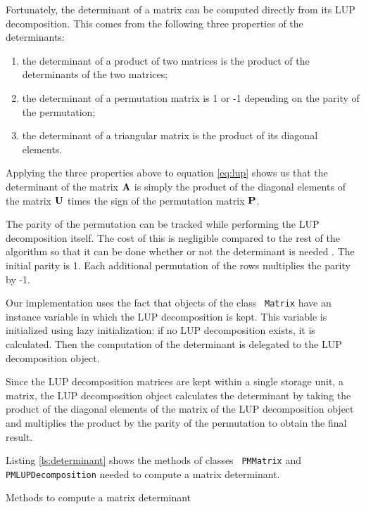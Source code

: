 \documentclass[twoside]{book}
\begin{document}
Fortunately, the determinant of a matrix can be computed directly
from its LUP decomposition. This comes from the following three
properties of the determinants:
\begin{enumerate}
  \item the determinant of a product of two matrices is the product of the determinants of the two
  matrices;
  \item the determinant of a permutation matrix is 1 or -1 depending on the parity of the
  permutation;
  \item the determinant of a triangular matrix is the product of its diagonal elements.
\end{enumerate}
Applying the three properties above to equation \ref{eq:lup} shows
us that the determinant of the matrix ${\bf A}$ is simply the
product of the diagonal elements of the matrix ${\bf U}$ times the
sign of the permutation matrix ${\bf P}$.

The parity of the permutation can be tracked while performing the
LUP decomposition itself. The cost of this is negligible compared
to the rest of the algorithm so that it can be done whether or not
the determinant is needed . The initial parity is 1. Each
additional permutation of the rows multiplies the parity by -1.

Our implementation uses the fact that objects of the class {\tt
Matrix} have an instance variable in which the LUP decomposition
is kept. This variable is initialized using lazy initialization:
if no LUP decomposition exists, it is calculated. Then the
computation of the determinant is delegated to the LUP
decomposition object.

Since the LUP decomposition matrices are kept within a single
storage unit, a matrix, the LUP decomposition object calculates
the determinant by taking the product of the diagonal elements of
the matrix of the LUP decomposition object and multiplies the
product by the parity of the permutation to obtain the final
result.

Listing \ref{ls:determinant} shows the methods of classes {\tt
PMMatrix} and {\tt PMLUPDecomposition} needed to compute a
matrix determinant.

\begin{listing} Methods to compute a matrix determinant \label{ls:determinant}


\end{listing}
\end{document}
